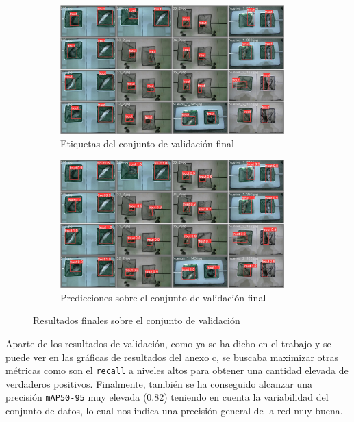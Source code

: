 \begin{figure}[H]
    \centering
    \begin{subfigure}[b]{0.9\textwidth}
        \centering
        \includegraphics[width=0.95\textwidth]{images/7/labels.jpg}
        \caption{Etiquetas del conjunto de validación final}
    \end{subfigure}
    \begin{subfigure}[b]{0.9\textwidth}
        \centering
        \includegraphics[width=0.95\textwidth]{images/7/pred.jpg}
        \caption{Predicciones sobre el conjunto de validación final}
    \end{subfigure}
    \caption{Resultados finales sobre el conjunto de validación}
    \label{fig:ValidacionRed}
\end{figure}
\clearpage
Aparte de los resultados de validación, como ya se ha dicho en el trabajo y se puede ver en \hyperref[train:final]{las gráficas de resultados del anexo c}, se buscaba maximizar otras métricas como son 
el \texttt{recall} a niveles altos para obtener una cantidad elevada de verdaderos 
positivos. Finalmente, también se ha conseguido alcanzar una precisión \texttt{mAP50-95} muy elevada (0.82) teniendo en cuenta la variabilidad del conjunto de datos, lo cual nos indica una precisión 
general de la red muy buena.

